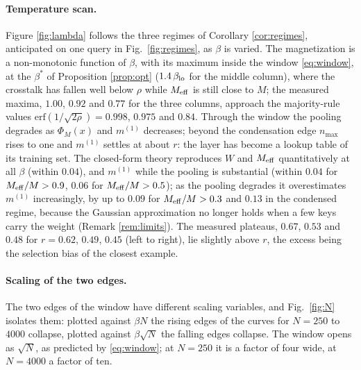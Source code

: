 \documentclass[11pt,a4paper]{article}
\newcommand{\Meff}{M_{\rm eff}}
\newcommand{\erf}{\mathrm{erf}}
\begin{document}
\paragraph{Temperature scan.} Figure \ref{fig:lambda} follows the three regimes of Corollary \ref{cor:regimes}, anticipated on one query in Fig.\ \ref{fig:regimes}, as $\beta$ is varied. The magnetization is a non-monotonic function of $\beta$, with its maximum inside the window \eqref{eq:window}, at the $\beta^*$ of Proposition \ref{prop:opt} ($1.4\,\beta_{\rm lo}$ for the middle column), where the crosstalk has fallen well below $\rho$ while $\Meff$ is still close to $M$; the measured maxima, $1.00$, $0.92$ and $0.77$ for the three columns, approach the majority-rule values $\erf(1/\sqrt{2\rho})=0.998$, $0.975$ and $0.84$. Through the window the pooling degrades as $\Phi_M(x)$ and $m^{(1)}$ decreases; beyond the condensation edge $n_{\max}$ rises to one and $m^{(1)}$ settles at about $r$: the layer has become a lookup table of its training set. The closed-form theory reproduces $W$ and $\Meff$ quantitatively at all $\beta$ (within $0.04$), and $m^{(1)}$ while the pooling is substantial (within $0.04$ for $\Meff/M>0.9$, $0.06$ for $\Meff/M>0.5$); as the pooling degrades it overestimates $m^{(1)}$ increasingly, by up to $0.09$ for $\Meff/M>0.3$ and $0.13$ in the condensed regime, because the Gaussian approximation no longer holds when a few keys carry the weight (Remark \ref{rem:limits}). The measured plateaus, $0.67$, $0.53$ and $0.48$ for $r=0.62$, $0.49$, $0.45$ (left to right), lie slightly above $r$, the excess being the selection bias of the closest example.

\paragraph{Scaling of the two edges.} The two edges of the window have different scaling variables, and Fig.\ \ref{fig:N} isolates them: plotted against $\beta N$ the rising edges of the curves for $N=250$ to $4000$ collapse, plotted against $\beta\sqrt N$ the falling edges collapse. The window opens as $\sqrt N$, as predicted by \eqref{eq:window}; at $N=250$ it is a factor of four wide, at $N=4000$ a factor of ten.
\end{document}
